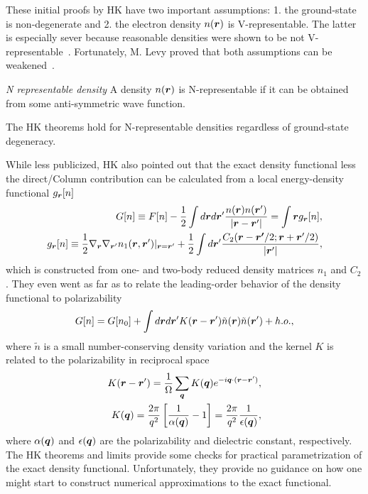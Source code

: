 These initial proofs by HK have two important assumptions: 1. the ground-state is non-degenerate and 2. the electron density $n(\boldsymbol{r})$ is V-representable. The latter is especially sever because reasonable densities were shown to be not V-representable~\cite{Levy1982,Lieb1983}. Fortunately, M. Levy proved that both assumptions can be weakened~\cite{Levy1979}.
\begin{definition}
\textit{N representable density} A density $n(\boldsymbol{r})$ is N-representable if it can be obtained from some anti-symmetric wave function.
\end{definition}
The HK theorems hold for N-representable densities regardless of ground-state degeneracy.

While less publicized, HK also pointed out that the exact density functional less the direct/Column contribution can be calculated from a local energy-density functional $g_{\boldsymbol{r}}[n]$
\begin{align}
G[n]\equiv F[n]-\frac{1}{2}\int d\boldsymbol{r}d\boldsymbol{r}' \dfrac{n(\boldsymbol{r})n(\boldsymbol{r}')}{\vert\boldsymbol{r}-\boldsymbol{r}'\vert}=\int \boldsymbol{r} g_{\boldsymbol{r}}[n],\\
g_{\boldsymbol{r}}[n] \equiv \frac{1}{2}\nabla_{\boldsymbol{r}}\nabla_{\boldsymbol{r}'} n_1(\boldsymbol{r}, \boldsymbol{r}')\vert_{\boldsymbol{r}=\boldsymbol{r}'}+
\frac{1}{2}\int d\boldsymbol{r}' \dfrac{C_2(\boldsymbol{r}-\boldsymbol{r'}/2;\boldsymbol{r}+\boldsymbol{r}'/2)}{\vert\boldsymbol{r}'\vert},
\end{align}
which is constructed from one- and two-body reduced density matrices $n_1$ and $C_2$. They even went as far as to relate the leading-order behavior of the density functional to polarizability
\begin{align}
G[n] = G[n_0] + \int d\boldsymbol{r}d\boldsymbol{r}' K(\boldsymbol{r}-\boldsymbol{r}')\tilde{n}(\boldsymbol{r})\tilde{n}(\boldsymbol{r}')+h.o.,
\end{align}
where $\tilde{n}$ is a small number-conserving density variation and the kernel $K$ is related to the polarizability in reciprocal space
\begin{align}
K(\boldsymbol{r}-\boldsymbol{r}') = \dfrac{1}{\Omega}\sum\limits_{\boldsymbol{q}} K(\boldsymbol{q}) e^{-i\boldsymbol{q}\cdot(\boldsymbol{r}-\boldsymbol{r}')}, \\
K(\boldsymbol{q}) = \dfrac{2\pi}{q^2}\left[ \frac{1}{\alpha(\boldsymbol{q})}-1 \right] = \dfrac{2\pi}{q^2}\dfrac{1}{\epsilon(\boldsymbol{q})},
\end{align}
where $\alpha(\boldsymbol{q})$ and $\epsilon(\boldsymbol{q})$ are the polarizability and dielectric constant, respectively. The HK theorems and limits provide some checks for practical parametrization of the exact density functional. Unfortunately, they provide no guidance on how one might start to construct numerical approximations to the exact functional.

